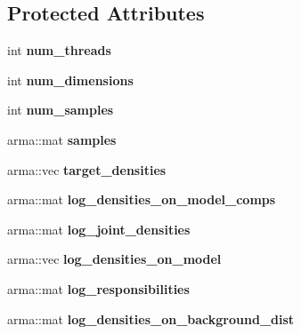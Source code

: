 \subsection*{Protected Attributes}
\begin{DoxyCompactItemize}
\item 
int {\bfseries num\+\_\+threads}\hypertarget{classVIPS_accccca2a57a73de29ee07a8a76c9c941}{}\label{classVIPS_accccca2a57a73de29ee07a8a76c9c941}

\item 
int {\bfseries num\+\_\+dimensions}\hypertarget{classVIPS_ae2fc04069049b703933aa1a1834067a2}{}\label{classVIPS_ae2fc04069049b703933aa1a1834067a2}

\item 
int {\bfseries num\+\_\+samples}\hypertarget{classVIPS_ac99a855e6f284c3028435dd23fea3c06}{}\label{classVIPS_ac99a855e6f284c3028435dd23fea3c06}

\item 
arma\+::mat {\bfseries samples}\hypertarget{classVIPS_a16a3f01a04f8a2aabb4972912e4f105d}{}\label{classVIPS_a16a3f01a04f8a2aabb4972912e4f105d}

\item 
arma\+::vec {\bfseries target\+\_\+densities}\hypertarget{classVIPS_a27193a3430c50755c6342ed370df794b}{}\label{classVIPS_a27193a3430c50755c6342ed370df794b}

\item 
arma\+::mat {\bfseries log\+\_\+densities\+\_\+on\+\_\+model\+\_\+comps}\hypertarget{classVIPS_acd32741f14cf0d1793cf6e64b636fcc0}{}\label{classVIPS_acd32741f14cf0d1793cf6e64b636fcc0}

\item 
arma\+::mat {\bfseries log\+\_\+joint\+\_\+densities}\hypertarget{classVIPS_a4a84ac52b3f3475ad4efeabc6d92c1c3}{}\label{classVIPS_a4a84ac52b3f3475ad4efeabc6d92c1c3}

\item 
arma\+::vec {\bfseries log\+\_\+densities\+\_\+on\+\_\+model}\hypertarget{classVIPS_a6c98147f1bba2bf4467714bb1070f5b6}{}\label{classVIPS_a6c98147f1bba2bf4467714bb1070f5b6}

\item 
arma\+::mat {\bfseries log\+\_\+responsibilities}\hypertarget{classVIPS_a17f93d9215dbee5127d94fd65b61848e}{}\label{classVIPS_a17f93d9215dbee5127d94fd65b61848e}

\item 
arma\+::mat {\bfseries log\+\_\+densities\+\_\+on\+\_\+background\+\_\+dist}\hypertarget{classVIPS_abe994fe945632006165a985c4c89f4b8}{}\label{classVIPS_abe994fe945632006165a985c4c89f4b8}


\end{DoxyCompactItemize}
